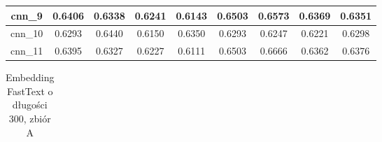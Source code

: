 \begin{table}[h]
\begin{tabular} {|c|c|c|c|c|c|c|c|c| }
        cnn\_9   & 0.6406                        & 0.6338                         & 0.6241                      & 0.6143                  & 0.6503 & 0.6573 & 0.6369 & 0.6351 \\ \hline
        cnn\_10  & 0.6293                        & 0.6440                         & 0.6150                      & 0.6350                  & 0.6293 & 0.6247 & 0.6221 & 0.6298 \\ \hline
        cnn\_11  & 0.6395                        & 0.6327                         & 0.6227                      & 0.6111                  & 0.6503 & 0.6666 & 0.6362 & 0.6376 \\ \hline
    \end{tabular}
\end{table}


\begin{table}[p] \centering
    \caption{Embedding FastText o długości 300, zbiór A}
    \label{tab:wyniki_fasttext_A}
    \begin{tabular}{|c|c|c|c|c|c|c|c|c|}    \hline


\end{tabular}
\end{table}
